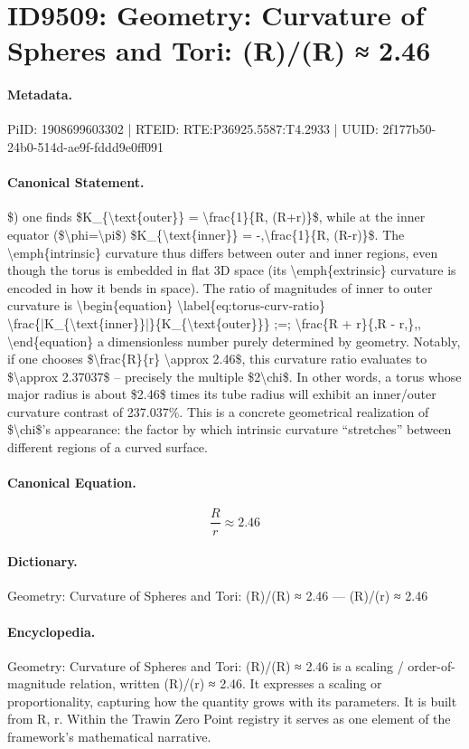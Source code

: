 \section*{ID9509: Geometry: Curvature of Spheres and Tori: (R)/(R) ≈ 2.46}
\paragraph{Metadata.}
PiID: 1908699603302 | RTEID: RTE:P36925.5587:T4.2933 | UUID: 2f177b50-24b0-514d-ae9f-fddd9e0ff091

\paragraph{Canonical Statement.}
\$) one finds \$K\_\{\textbackslash{}text\{outer\}\} = \textbackslash{}frac\{1\}\{R, (R+r)\}\$, while at the inner equator (\$\textbackslash{}phi=\textbackslash{}pi\$) \$K\_\{\textbackslash{}text\{inner\}\} = -,\textbackslash{}frac\{1\}\{R, (R-r)\}\$. The \textbackslash{}emph\{intrinsic\} curvature thus differs between outer and inner regions, even though the torus is embedded in flat 3D space (its \textbackslash{}emph\{extrinsic\} curvature is encoded in how it bends in space). The ratio of magnitudes of inner to outer curvature is \textbackslash{}begin\{equation\} \textbackslash{}label\{eq:torus-curv-ratio\} \textbackslash{}frac\{|K\_\{\textbackslash{}text\{inner\}\}|\}\{K\_\{\textbackslash{}text\{outer\}\}\} ;=; \textbackslash{}frac\{R + r\}\{,R - r,\},, \textbackslash{}end\{equation\} a dimensionless number purely determined by geometry. Notably, if one chooses \$\textbackslash{}frac\{R\}\{r\} \textbackslash{}approx 2.46\$, this curvature ratio evaluates to \$\textbackslash{}approx 2.37037\$ – precisely the multiple \$2\textbackslash{}chi\$. In other words, a torus whose major radius is about \$2.46\$ times its tube radius will exhibit an inner/outer curvature contrast of 237.037\%. This is a concrete geometrical realization of \$\textbackslash{}chi\$’s appearance: the factor by which intrinsic curvature “stretches” between different regions of a curved surface.

\paragraph{Canonical Equation.}
\[
\frac{R}{r} \approx 2.46
\]

\paragraph{Dictionary.}
Geometry: Curvature of Spheres and Tori: (R)/(R) ≈ 2.46 — (R)/(r) ≈ 2.46

\paragraph{Encyclopedia.}
Geometry: Curvature of Spheres and Tori: (R)/(R) ≈ 2.46 is a scaling / order-of-magnitude relation, written (R)/(r) ≈ 2.46. It expresses a scaling or proportionality, capturing how the quantity grows with its parameters. It is built from R, r. Within the Trawin Zero Point registry it serves as one element of the framework's mathematical narrative.
